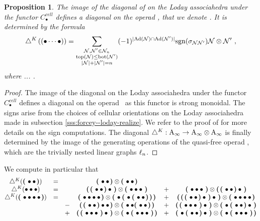 \documentclass[twoside, 12pt]{amsart}
\newtheorem{proposition}[definition]{Proposition}
\theoremstyle{remark}
\begin{document}
\begin{proposition}
\label{prop:diagonal-polytopale-a-infini}
The image of the diagonal of \cite{MTTV19} on the Loday associahedra under the functor $C_\bullet^{cell}$ defines a diagonal on the operad \Ainf , that we denote \diagainf . It is determined by the formula 
\[ \diagainf \left( (\bullet \cdots \bullet) \right) = 
\sum_{\substack{
  \mathcal{N},\mathcal{N}' \in \mathcal{N}_n \\ 
  \tp(\mathcal{N}) \leq \bm(\mathcal{N'}) \\
  |\mathcal{N}|+|\mathcal{N}'|=n
}}
(-1)^{|\mathrm{Ad}(\mathcal{N})\cap \mathrm{Ad}(\mathcal{N}')|}\mathrm{sgn}(\sigma_{\mathcal{N}\mathcal{N}'})\mathcal{N} \otimes \mathcal{N}' \ , \] 
where ... . 
\end{proposition}

\begin{proof}
The image of the diagonal on the Loday associahedra under the functor $C_\bullet^{cell}$ defines a diagonal on the operad \Ainf\ as this functor is strong monoidal. 
The signs arise from the choices of cellular orientations on the Loday associahedra made in subsection \ref{sss:forcey--loday-realize}. We refer to the proof of \cite[Proposition 4.27]{LA21} for more details on the sign computations. The diagonal $\diagainf : \Ainf \rightarrow \Ainf \otimes \Ainf$ is finally determined by the image of the generating operations of the quasi-free operad \Ainf , which are the trivially nested linear graphs $\gra_n$.
\end{proof}

We compute in particular that
\[ \begin{matrix}
\diagainf ( \black { \bullet \bullet } ) 
&=& & \black{\bullet \bullet} \otimes \black{\bullet \bullet} & & \\
\diagainf ( \bullet \bullet \bullet ) 
&=& & \black{\black{\bullet \bullet} \bullet} \otimes \black{\bullet \bullet \bullet} &+& \black{\bullet \bullet \bullet} \otimes \black{\black{\bullet \bullet} \bullet} \\
\diagainf ( \black{ \bullet \bullet \bullet \bullet} ) 
&=& & 
\black{\bullet \bullet \bullet \bullet} \otimes \black{\bullet \black{ \bullet \black{ \bullet \bullet }} }  
&+& \black{ \black{ \black{\bullet \bullet} \bullet } \bullet }  \otimes \black{ \bullet \bullet \bullet \bullet } \\
& & -& \black{ \black{\bullet \bullet } \bullet \bullet } \otimes \black{ \bullet \bullet \black{ \bullet \bullet }}  &+& \black{ \black{ \bullet \bullet \bullet } \bullet }  \otimes \black{ \bullet \black{ \bullet \bullet } \bullet }  \\ 
& & +& \black{ \black{ \bullet \bullet \bullet } \bullet }  \otimes \black{ \bullet \black{ \bullet \bullet \bullet }} &+& \black{ \bullet \black{ \bullet \bullet } \bullet } \otimes \black{ \bullet \black{ \bullet \bullet \bullet }}
\end{matrix} \]
\end{document}
